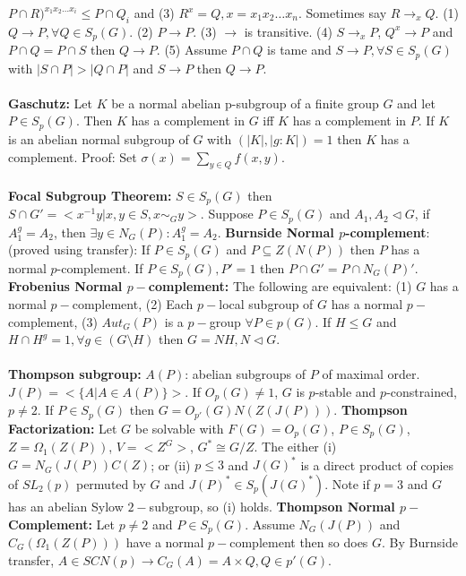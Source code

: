 $P \cap R)^{x_1 x_2 \ldots x_i} \le P \cap Q_i$ and (3)
$R^x=Q, x= x_1 x_2 \ldots x_n$.  Sometimes say $R \rightarrow_x Q$.
(1) $Q \rightarrow P, \forall Q \in S_p(G)$.  (2) $P \rightarrow P$. 
(3) $\rightarrow$ is transitive.
(4) $S \rightarrow_x P$, $Q^x \rightarrow P$ and $P \cap Q = P \cap S$
then $Q \rightarrow P$.  (5) Assume $P \cap Q$ is tame and 
$S \rightarrow P, \forall S \in S_p(G)$ with $|S \cap P| > |Q \cap P|$ and $S \rightarrow P$
then $Q \rightarrow P$.\\
\\
{\bf Gaschutz:}  Let $K$ be a normal abelian p-subgroup of a finite group $G$ and let
$P \in S_p(G)$.  Then $K$ has a complement in $G$ iff $K$ has a complement in $P$.
If $K$ is an abelian normal subgroup of $G$ with $(|K|,|g:K|)=1$
then $K$ has a complement.  Proof: Set $\sigma(x)= \sum_{y \in Q} f(x, y)$.\\
\\
{\bf Focal Subgroup Theorem:}
$S \in S_p (G)$ then $S \cap G' = <x^{-1} y | x,y \in S, x \sim _G y>$.
Suppose $P \in S_p(G)$ and $A_1, A_2 \lhd G$, if $A_1^g=A_2$, then $\exists y \in N_G(P):
A_1^g=A_2$.
{\bf Burnside Normal $p$-complement}: (proved using transfer):  
If $P \in S_p(G)$ and $P \subseteq Z(N(P))$ then $P$
has a normal $p$-complement.
If $P \in S_p (G), P'=1$ then $P \cap G' = P \cap N_G(P)'$.
{\bf Frobenius Normal $p-$complement:}  The following are equivalent:
(1) $G$ has a normal $p-$complement, 
(2) Each $p-$local subgroup of $G$ has a normal $p-$complement,
(3) $Aut_G(P)$ is a $p-$group $\forall P \in p(G)$.
If $H \le G$ and $H \cap H^g = 1, \forall g \in (G \setminus H)$ then $G=NH, N \lhd G$.
\\
\\
{\bf Thompson subgroup:} $A(P)$: abelian subgroups of $P$ of maximal order.
$J(P)= <\{ A | A \in A(P) \} >$.  If $O_p(G) \ne 1$, $G$ is $p$-stable
and $p$-constrained, $p \ne 2$.  If $P \in S_p (G)$ then
$G= O_{p'} (G) N(Z(J(P)))$.
{\bf Thompson Factorization:} Let $G$ be solvable with $F(G)=O_p(G)$, $P \in S_p(G)$,
$Z= \Omega_1 (Z(P))$, $V=<Z^G>$, $G^* \cong G/Z$.  The either (i) $G=N_G(J(P))C(Z)$; or
(ii) $p \le 3$ and $J(G)^*$ is a direct product of copies of
$SL_2(p)$ permuted by $G$ and $J(P)^* \in S_p(J(G)^*)$.  Note if
$p=3$ and $G$ has an abelian Sylow $2-$subgroup, so (i) holds.
{\bf Thompson Normal $p-$Complement:}
Let $p \ne 2$ and $P \in S_p(G)$.  Assume $N_G(J(P))$
and $C_G(\Omega_1(Z(P)))$ have a normal $p-$complement then so does $G$.
By Burnside transfer, $A \in SCN(p) \rightarrow C_G(A)= A \times Q, Q \in p'(G)$.
